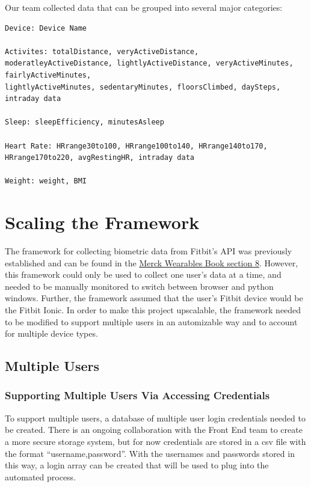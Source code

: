 \documentclass[]{book}
\begin{document}
Our team collected data that can be grouped into several major categories:

\begin{verbatim}
Device: Device Name

Activites: totalDistance, veryActiveDistance, moderatleyActiveDistance, lightlyActiveDistance, veryActiveMinutes, fairlyActiveMinutes, 
lightlyActiveMinutes, sedentaryMinutes, floorsClimbed, daySteps, intraday data

Sleep: sleepEfficiency, minutesAsleep

Heart Rate: HRrange30to100, HRrange100to140, HRrange140to170, HRrange170to220, avgRestingHR, intraday data

Weight: weight, BMI
\end{verbatim}

\hypertarget{scaling-the-framework}{%
\section{Scaling the Framework}\label{scaling-the-framework}}

The framework for collecting biometric data from Fitbit's API was previously established and can be found in the \href{https://nicholasrosenorn.github.io/wearables-book/tutorial-data-capture-in-python.html\#authentication}{Merck Wearables Book section 8}. However, this framework could only be used to collect one user's data at a time, and needed to be manually monitored to switch between browser and python windows. Further, the framework assumed that the user's Fitbit device would be the Fitbit Ionic. In order to make this project upscalable, the framework needed to be modified to support multiple users in an automizable way and to account for multiple device types.

\hypertarget{multiple-users}{%
\subsection{Multiple Users}\label{multiple-users}}

\hypertarget{supporting-multiple-users-via-accessing-credentials}{%
\subsubsection{Supporting Multiple Users Via Accessing Credentials}\label{supporting-multiple-users-via-accessing-credentials}}

To support multiple users, a database of multiple user login credentials needed to be created. There is an ongoing collaboration with the Front End team to create a more secure storage system, but for now credentials are stored in a csv file with the format ``username,password''. With the usernames and passwords stored in this way, a login array can be created that will be used to plug into the automated process.
\end{document}
